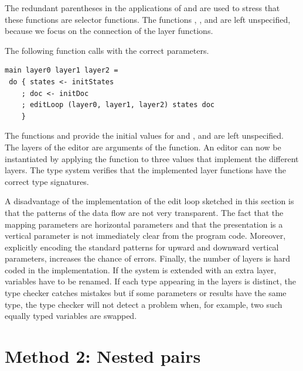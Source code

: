 \documentclass[preprint,natbib]{sigplanconf}
\begin{document}

The redundant parentheses in the applications of  and  are used to stress that these functions are selector functions. The functions , , and  are left unspecified, because we focus on the connection of the layer functions. 

The following function  calls  with the correct parameters.

\begin{small}
\begin{verbatim}
main layer0 layer1 layer2 = 
 do { states <- initStates
    ; doc <- initDoc 
    ; editLoop (layer0, layer1, layer2) states doc
    }
\end{verbatim}
\end{small}

The functions  and  provide the initial values for  and , and are left unspecified. The layers of the editor are arguments of the  function. An editor can now be instantiated by applying the function  to three  values that implement the different layers. The type system verifies that the implemented layer functions have the correct type signatures.

A disadvantage of the implementation of the edit loop sketched in this section is that the patterns of the data flow are not very transparent. The fact that the mapping parameters are horizontal parameters and that the presentation is a vertical parameter is not immediately clear from the program code. Moreover, explicitly encoding the standard patterns for upward and downward vertical parameters, increases the chance of errors. Finally, the number of layers is hard coded in the implementation. If the system is extended with an extra layer, variables have to be renamed. If each type appearing in the layers is distinct, the type checker catches mistakes but if some parameters or results have the same type, the type checker will not detect a problem when, for example, two such equally typed variables are swapped. 



%																
%																
%																
\section{Method 2: Nested pairs}\label{sect:ncp}
\end{document}
